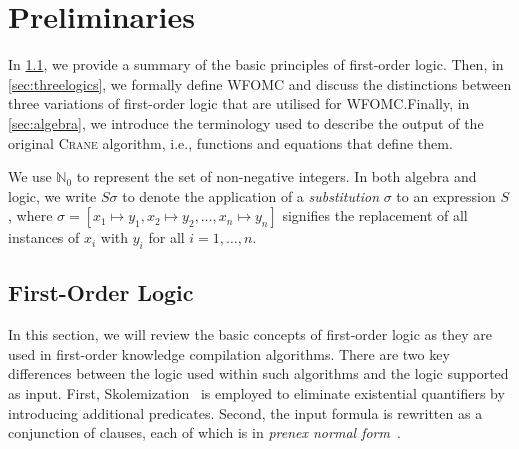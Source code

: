 \documentclass[letterpaper]{article} %
\theoremstyle{remark}
\theoremstyle{definition}
\begin{document}
\section{Preliminaries}

In \cref{sec:logic}, we provide a summary of the basic principles of first-order
logic. Then, in \cref{sec:threelogics}, we formally define WFOMC and discuss the
distinctions between three variations of first-order logic that are utilised for
WFOMC.\@ Finally, in \cref{sec:algebra}, we introduce the terminology used to
describe the output of the original \textsc{Crane} algorithm, i.e., functions
and equations that define them.

We use $\mathbb{N}_{0}$ to represent the set of non-negative integers. In both
algebra and logic, we write $S\sigma$ to denote the application of a
\emph{substitution} $\sigma$ to an expression $S$, where
$\sigma = [x_{1} \mapsto y_{1}, x_{2} \mapsto y_{2}, \dots, x_{n} \mapsto y_{n}]$
signifies the replacement of all instances of $x_{i}$ with $y_{i}$ for all
$i = 1, \dots, n$.

\subsection{First-Order Logic}\label{sec:logic}

In this section, we will review the basic concepts of first-order logic as they
are used in first-order knowledge compilation algorithms. There are two key
differences between the logic used within such algorithms and the logic
supported as input. First, Skolemization~\cite{DBLP:conf/kr/BroeckMD14} is
employed to eliminate existential quantifiers by introducing additional
predicates. Second, the input formula is rewritten as a conjunction of clauses,
each of which is in \emph{prenex normal form}~\cite{hinman2018fundamentals}.
\end{document}
